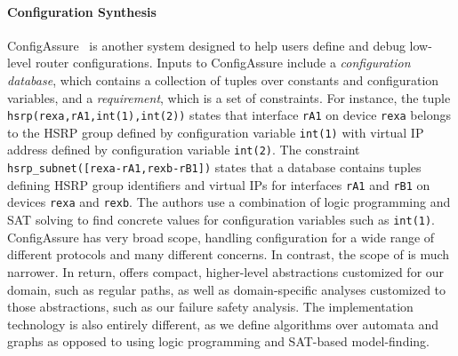 \paragraph*{Configuration Synthesis}  
ConfigAssure~\cite{narain:lisa05,narain+:configassure} 
is another system designed to
help users define and debug low-level router
configurations.  Inputs to
ConfigAssure include a \emph{configuration database}, which contains a
collection of tuples over constants and configuration variables, and a
\emph{requirement}, which is a set of constraints.  For instance, the
tuple \texttt{hsrp(rexa,rA1,int(1),int(2))} states that interface
\texttt{rA1} on device \texttt{rexa} belongs to the HSRP group defined
by configuration variable \texttt{int(1)} with virtual IP address
defined by configuration variable \texttt{int(2)}.  The constraint
\texttt{hsrp\_subnet([rexa-rA1,rexb-rB1])} states that a database
contains tuples defining HSRP group identifiers and virtual IPs for
interfaces \texttt{rA1} and \texttt{rB1} on devices \texttt{rexa} and
\texttt{rexb}.  The authors use a combination of logic programming and
SAT solving to find concrete values for configuration variables such
as \texttt{int(1)}.  ConfigAssure has very broad scope, handling
configuration for a wide range of different protocols and many
different concerns.  In contrast, the scope of \sysname is much
narrower.  In return, \sysname offers compact, higher-level
abstractions customized for our domain, such as regular paths, as well
as domain-specific analyses customized to those abstractions, such as
our failure safety analysis.  The implementation technology is also
entirely different, as we define algorithms over automata and graphs
as opposed to using logic programming and SAT-based model-finding.
